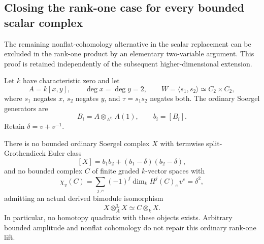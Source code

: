 \subsection{Closing the rank-one case for every bounded scalar complex}

The remaining nonflat-cohomology alternative in the scalar
replacement can be excluded in the rank-one product by an
elementary two-variable argument. This proof is retained
independently of the subsequent higher-dimensional extension.

Let \(k\) have characteristic zero and let
\[
 A=k[x,y],\qquad \deg x=\deg y=2,\qquad
 W=\langle s_1,s_2\rangle\simeq C_2\times C_2,
\]
where \(s_1\) negates \(x\), \(s_2\) negates \(y\), and
\(\tau=s_1s_2\) negates both. The ordinary Soergel generators are
\[
 B_i=A\otimes_{A^{s_i}}A(1),\qquad b_i=[B_i].
\]
Retain \(\delta=v+v^{-1}\).

\begin{finding}
\label{f:rankOneScalarClosure}
There is no bounded ordinary Soergel complex \(X\) with
termwise split-Grothendieck Euler class
\begin{equation}\label{eq:rankOneScalarClass}
 [X]=b_1b_2+(b_1-\delta)(b_2-\delta),
\end{equation}
and no bounded complex \(C\) of finite graded \(k\)-vector
spaces with
\begin{equation}\label{eq:rankOneScalarEuler}
 \chi_v(C)=\sum_{j,e}(-1)^j\dim_kH^j(C)_e\,v^e
         =\delta^2,
\end{equation}
admitting an actual derived bimodule isomorphism
\begin{equation}\label{eq:rankOneScalarQuadratic}
 X\otimes_A^{\mathbf L}X\simeq C\otimes_kX.
\end{equation}
In particular, no homotopy quadratic with these objects
exists. Arbitrary bounded amplitude and nonflat
cohomology do not repair this ordinary rank-one lift.
\end{finding}

